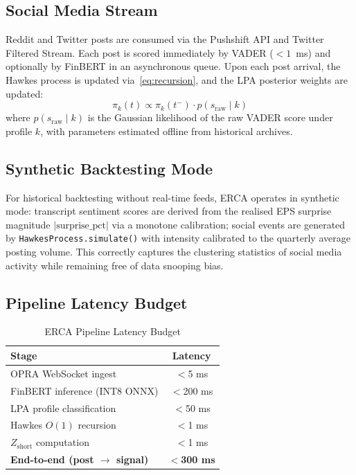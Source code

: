 \documentclass[10pt,twocolumn]{article}
\newcommand{\Zshort}{Z_{\mathrm{short}}}
\begin{document}
\subsection{Social Media Stream}

Reddit and Twitter posts are consumed via the Pushshift API and Twitter
Filtered Stream. Each post is scored immediately by VADER ($<1$~ms) and
optionally by FinBERT in an asynchronous queue. Upon each post arrival, the
Hawkes process is updated via~\eqref{eq:recursion}, and the LPA posterior
weights are updated:
\begin{equation}
\pi_k(t)\propto\pi_k(t^-)\cdot p(s_{\mathrm{raw}}\mid k)
\end{equation}
where $p(s_{\mathrm{raw}}\mid k)$ is the Gaussian likelihood of the raw
VADER score under profile $k$, with parameters estimated offline from
historical archives.

\subsection{Synthetic Backtesting Mode}

For historical backtesting without real-time feeds, ERCA operates in
synthetic mode: transcript sentiment scores are derived from the realised EPS
surprise magnitude $|\text{surprise\_pct}|$ via a monotone calibration;
social events are generated by \texttt{HawkesProcess.simulate()} with
intensity calibrated to the quarterly average posting volume. This correctly
captures the clustering statistics of social media activity while remaining
free of data snooping bias.

\subsection{Pipeline Latency Budget}

\begin{table}[htbp]
\centering
\caption{ERCA Pipeline Latency Budget}
\label{tab:latency}
\begin{tabular}{lc}
\toprule
Stage & Latency \\
\midrule
OPRA WebSocket ingest            & $<$5 ms   \\
FinBERT inference (INT8 ONNX)    & $<$200 ms \\
LPA profile classification       & $<$50 ms  \\
Hawkes $O(1)$ recursion          & $<$1 ms   \\
$\Zshort$ computation            & $<$1 ms   \\
\midrule
\textbf{End-to-end (post $\to$ signal)} & \textbf{$<$300 ms} \\
\bottomrule
\end{tabular}
\end{table}
\end{document}
